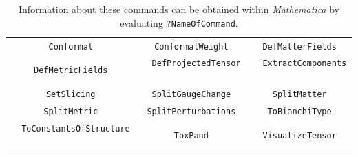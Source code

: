 \documentclass[notitlepage,onecolumn,floatfix,preprintnumbers,aps,prd,showpacs,nofootinbib,amsmath,amssymb,amsfonts]{revtex4-1}
\newcommand{\<}{\langle}
\renewcommand{\>}{\rangle}
\begin{document}
\vspace{-2mm}
\begin{table}[htb]
	\begin{tabular}{|c|c|c|}
		\hline
	{\tt Conformal}&
	{\tt ConformalWeight}&
	{\tt DefMatterFields} \\
	{\tt DefMetricFields}&
	{\tt \, DefProjectedTensor \,}&
	{\tt \, ExtractComponents \,} \\
	{\tt SetSlicing}&
	{\tt SplitGaugeChange}&
	{\tt SplitMatter} \\
	{\tt SplitMetric}&
	{\tt SplitPerturbations}&
	{\tt ToBianchiType} \\
	{\tt \, ToConstantsOfStructure \,}&
	{\tt ToxPand}&
	{\tt VisualizeTensor}\\[2pt]
                \hline
	\end{tabular}
	\caption{Information about these commands can be obtained within \textit{Mathematica} by evaluating {\tt ?NameOfCommand}.}
	\label{tab:commands}
\end{table}
\end{document}
